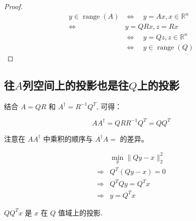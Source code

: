 \begin{proof}
    $$
\begin{aligned}
y \in \operatorname{range}(A) & \Leftrightarrow \quad y=A x, x \in \mathbb{R}^{n} \\
\Leftrightarrow & y=Q R x, z=R x \\
& \Leftrightarrow \quad y=Q z, z \in \mathbb{R}^{n} \\
& \Leftrightarrow \quad y \in \operatorname{range}(Q)
\end{aligned}
$$
\end{proof}

\subsection{往$A$列空间上的投影也是往$Q$上的投影}

结合 $A=Q R$ 和 $A^{\dagger}=R^{-1} Q^{T}$, 可得：

$$
A A^{\dagger}=Q R R^{-1} Q^{T}=Q Q^{T}
$$

\begin{remark}
    注意在 $A A^{\dagger}$ 中乘积的顺序与 $A^{\dagger} A=$ 的差异。
\end{remark}

$$
\begin{aligned}
&\min _{y}\|Q y-x\|_{2}^{2}\\
 \Rightarrow& Q^{T}(Q y-x)=0 \\
\Rightarrow& Q^{T} Q y=Q^{T} x\\ 
\Rightarrow & y=Q^{T} x
\end{aligned}
$$

$Q Q^{T} x$ 是 $x$ 在 $Q$ 值域上的投影.

